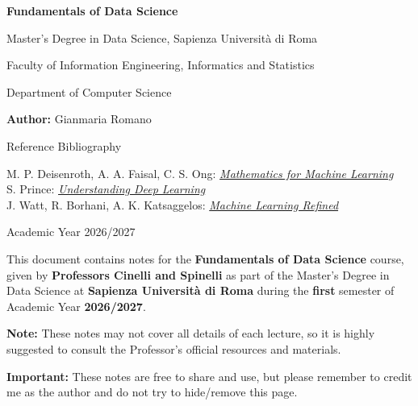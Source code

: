 \documentclass{report}
\begin{document}
\begin{titlepage}
    \centering
    \vspace*{2cm}
    
    {\Huge \bfseries Fundamentals of Data Science \par}
    \vspace{1.5cm}
    
    {\Large Master's Degree in Data Science, Sapienza Università di Roma \par}
    {\large Faculty of Information Engineering, Informatics and Statistics \par}
    \vspace{0.5cm}
    
    {\large Department of Computer Science \par}
    \vspace{3cm}
    
    {\Large \textbf{Author:} Gianmaria Romano \par}
    \vspace{3cm}

    {\Large Reference Bibliography \par}
    {\large M. P. Deisenroth, A. A. Faisal, C. S. Ong: \href{https://mml-book.github.io/}{\textit{Mathematics for Machine Learning}} \\
    S. Prince: \href{https://udlbook.github.io/udlbook/}{\textit{Understanding Deep Learning}} \\
    J. Watt, R. Borhani, A. K. Katsaggelos: \href{https://github.com/neonwatty/machine-learning-refined/tree/main}{\textit{Machine Learning Refined}} \\}
    \vfill
    
    {\large Academic Year 2026/2027 \par}
    \vspace*{1cm}
\end{titlepage}

\clearpage

\begin{tcolorbox}[colback=gray!5!white, colframe=gray!75!black, title=Disclaimer]
    This document contains notes for the \textbf{Fundamentals of Data Science} course, given by \textbf{Professors Cinelli and Spinelli} as part of the Master’s Degree in Data Science at \textbf{Sapienza Università di Roma} during the \textbf{first} semester of Academic Year \textbf{2026/2027}.
    
    \smallskip
    \textbf{Note: }These notes may not cover all details of each lecture, so it is highly suggested to consult the Professor's official resources and materials. 
    
    \smallskip
    \textbf{Important: }These notes are free to share and use, but please remember to credit me as the author and do not try to hide/remove this page.
\end{tcolorbox}
\end{document}
